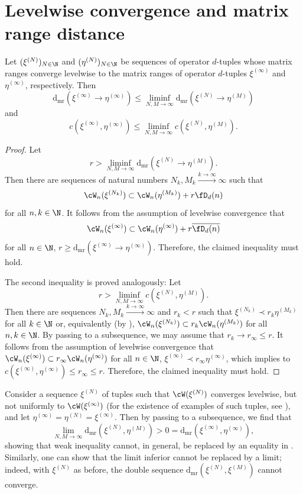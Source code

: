 \section{Levelwise convergence and matrix range distance}


  
\begin{theorem}\label{thm:limit_c}
  Let $(\xi^{(N)})_{N\in\N}$ and $(\eta^{(N)})_{N\in\N}$ be sequences of operator $d$-tuples whose matrix ranges converge levelwise to the matrix ranges of operator $d$-tuples $\xi^{(\infty)}$ and $\eta^{(\infty)}$, respectively. Then
  \[  \mathrm{d_{mr}}(\xi^{(\infty)}\to\eta^{(\infty)})\leq \liminf_{N,M\to\infty} \mathrm{d_{mr}}(\xi^{(N)}\to\eta^{(M)})\]
  and
  \[  c(\xi^{(\infty)},\eta^{(\infty)})\leq \liminf_{N,M\to\infty} c(\xi^{(N)},\eta^{(M)}).\]
\end{theorem}

\begin{proof}
  Let 
  \[
  r> \liminf_{N,M\to\infty} \mathrm{d_{mr}}(\xi^{(N)}\to\eta^{(M)}). 
  \]
  Then there are sequences of natural numbers $N_k,M_k\xrightarrow{k\to\infty}\infty$ such that 
  \[
  \cW_n(\xi^{(N_k)})\subset \cW_n(\eta^{(M_k)})+ r{\fD_d(n)}
  \]
  for all $n,k\in\N$. It follows from the assumption of levelwise convergence that 
  \[
  \cW_n(\xi^{(\infty)})\subset \cW_n(\eta^{(\infty)}) + r\overline{\fD_d(n)}
  \] 
  for all $n\in\N$, \ie $r\geq \mathrm{d_{mr}}(\xi^{(\infty)}\to\eta^{(\infty)})$. Therefore, the claimed inequality must hold.
  
 The second inequality is proved analogously: Let 
 \[
 r> \liminf_{N,M\to\infty} c(\xi^{(N)},\eta^{(M)}).
 \] 
 Then there are sequences $N_k,M_k\xrightarrow{k\to\infty}\infty$ and $r_k < r$ such that $\xi^{(N_k)}\prec r_k \eta^{(M_k)}$ for all $k\in\N$ or, equivalently (by \cite[Proposition 5.5]{DDSS17}), $\cW_n(\xi^{(N_k)})\subset r_k \cW_n(\eta^{(M_k)})$ for all $n,k\in\N$. 
 By passing to a subsequence, we may assume that $r_k \to r_\infty \leq r$. 
 It follows from the assumption of levelwise convergence that $\cW_n(\xi^{(\infty)})\subset r_\infty \cW_n(\eta^{(\infty)})$ for all $n\in\N$, \ie $\xi^{(\infty)}\prec r_\infty \eta^{(\infty)}$, which implies to $c(\xi^{(\infty)},\eta^{(\infty)}) \leq r_\infty \leq r$. 
 Therefore, the claimed inequality must hold.   
\end{proof}

\begin{remark}
Consider a sequence $\xi^{(N)}$ of tuples such that $\cW(\xi^{(N)})$ converges levelwise, but not uniformly to $\cW(\xi^{(\infty)})$ (for the existence of examples of such tuples, see \cite{PaPa21}), and let $\eta^{(\infty)} = \eta^{(N)} = \xi^{(\infty)}$. 
Then by passing to a subsequence, we find that 
\[
\lim_{N,M\to\infty} \mathrm{d_{mr}}(\xi^{(N)},\eta^{(M)}) > 0 = \mathrm{d_{mr}}(\xi^{(\infty)},\eta^{(\infty)}) , 
\]
showing that weak inequality cannot, in general, be replaced by an equality in . 
Similarly, one can show that the limit inferior cannot be replaced by a limit; indeed, with $\xi^{(N)}$ as before, the double sequence $\mathrm{d_{mr}}(\xi^{(N)},\xi^{(M)})$ cannot converge. 
\end{remark}


